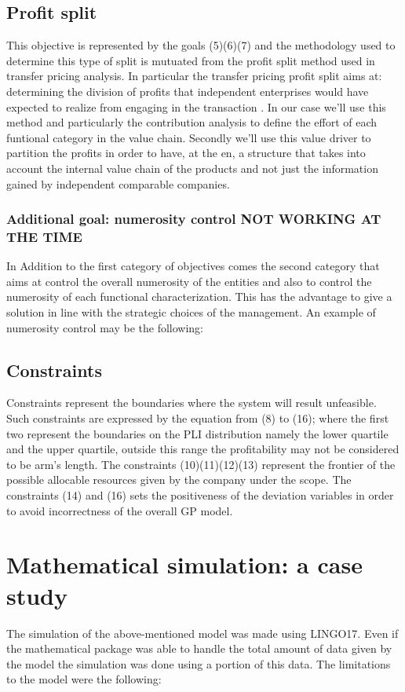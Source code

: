 \documentclass{article}
\begin{document}
\subsection{Profit split}
This objective is represented by the goals (5)(6)(7) and the methodology used to determine this type of split is mutuated from the profit split method used in transfer pricing analysis. In particular the transfer pricing profit split aims at: determining the division of profits that independent enterprises would have expected to realize from engaging in the transaction \cite{oecd_split}. In our case we'll use this method and particularly the contribution analysis to define the effort of each funtional category in the value chain. Secondly we'll use this value driver to partition the profits in order to have, at the en, a structure that takes into account the internal value chain of the products and not just the information gained by independent comparable companies.

\subsubsection{Additional goal: numerosity control NOT WORKING AT THE TIME}
In Addition to the first category of objectives comes the second category that aims at control the overall numerosity of the entities and also to control the numerosity of each functional characterization. This has the advantage to give a solution in line with the strategic choices of the management. An example of numerosity control may be the following:
\[
\]

\subsection{Constraints}
Constraints represent the boundaries where the system will result unfeasible. Such constraints are expressed by the equation from (8) to (16); where the first two represent the boundaries on the PLI distribution namely the lower quartile and the upper quartile, outside this range the profitability may not be considered to be arm's length. The constraints (10)(11)(12)(13) represent the frontier of the possible allocable resources given by the company under the scope. The constraints (14) and (16) sets the positiveness of the deviation variables in order to avoid incorrectness of the overall GP model. 


\section{Mathematical simulation: a case study}
The simulation of the above-mentioned model was made using LINGO17. Even if the mathematical package was able to handle the total amount of data given by the model the simulation was done using a portion of this data. The limitations to the model were the following:
\end{document}
